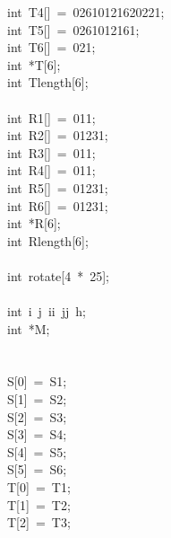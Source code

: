 \begin{tabbing}
\>int\ T4[]\ =\ 02610121620221;\\[0pt]
\>int\ T5[]\ =\ 0261012161;\\[0pt]
\>int\ T6[]\ =\ 021;\\[0pt]
\>int\ *T[6];\\[0pt]
\>int\ Tlength[6];\\[0pt]
\\[0pt]
\>int\ R1[]\ =\ 011;\\[0pt]
\>int\ R2[]\ =\ 01231;\\[0pt]
\>int\ R3[]\ =\ 011;\\[0pt]
\>int\ R4[]\ =\ 011;\\[0pt]
\>int\ R5[]\ =\ 01231;\\[0pt]
\>int\ R6[]\ =\ 01231;\\[0pt]
\>int\ *R[6];\\[0pt]
\>int\ Rlength[6];\\[0pt]
\\[0pt]
\>int\ rotate[4\ *\ 25];\\[0pt]
\\[0pt]
\>int\ i\ j\ ii\ jj\ h;\\[0pt]
\>int\ *M;\\[0pt]
\\[0pt]
\\[0pt]
\>S[0]\ =\ S1;\\[0pt]
\>S[1]\ =\ S2;\\[0pt]
\>S[2]\ =\ S3;\\[0pt]
\>S[3]\ =\ S4;\\[0pt]
\>S[4]\ =\ S5;\\[0pt]
\>S[5]\ =\ S6;\\[0pt]
\>T[0]\ =\ T1;\\[0pt]
\>T[1]\ =\ T2;\\[0pt]
\>T[2]\ =\ T3;\\[0pt]

\end{tabbing}
